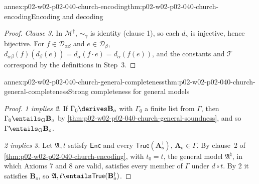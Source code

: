 \begin{annexitem}{annex:p02-w02-p02-040-church-encoding}{thm:p02-w02-p02-040-church-encoding}{Encoding and decoding}
\begin{proof}
\emph{Clause 3.}  In \(\mathcal M^\dagger\), \(\sim_\gamma\) is identity (clause
1), so each \(d_\gamma\) is injective, hence bijective.  For \(f\in\mathcal D_{\alpha\beta}\)
and \(e\in\mathcal D_\beta\),
\(d_{\alpha\beta}(f)(d_\beta(e))=d_\alpha(f\cdot e)=d_\alpha(f(e))\), and the
constants and \(\mathcal T\) correspond by the definitions in Step~3.
\end{proof}
\end{annexitem}

\begin{annexitem}{annex:p02-w02-p02-040-church-general-completeness}{thm:p02-w02-p02-040-church-general-completeness}{Strong completeness for general models}
\begin{proof}
\emph{1 implies 2.}  If \(\Gamma_0\derives\mathbf B_o\) with \(\Gamma_0\) a finite
list from \(\Gamma\), then \(\Gamma_0\entails_{\mathrm G}\mathbf B_o\) by
\cref{thm:p02-w02-p02-040-church-general-soundness}, and so
\(\Gamma\entails_{\mathrm G}\mathbf B_o\).

\emph{2 implies 3.}  Let \(\mathfrak A,t\) satisfy \(\mathsf{Enc}\) and every
\(\mathsf{True}(\mathbf A_o^\dagger)\), \(\mathbf A_o\in\Gamma\).  By clause~2 of
\cref{thm:p02-w02-p02-040-church-encoding}, with \(t_0=t\), the general model
\(\mathfrak A^\natural\), in which Axioms 7 and 8 are valid, satisfies every
member of \(\Gamma\) under \(d\circ t\).  By 2 it satisfies \(\mathbf B_o\), so
\(\mathfrak A,t\entails\mathsf{True}(\mathbf B_o^\dagger)\).


\end{proof}
\end{annexitem}
